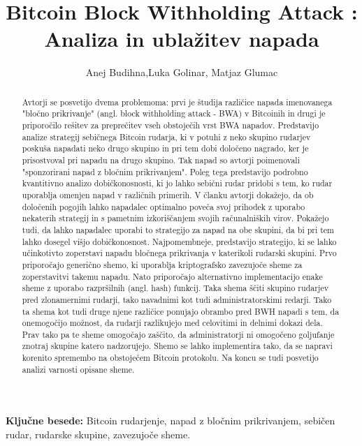 \documentclass[12pt]{article}
\begin{document}
\setcounter{page}{1}

\title{Bitcoin Block Withholding Attack : Analiza in ublažitev napada}
\author{Anej Budihna,Luka Golinar, Matjaz Glumac}


\maketitle
\begin{abstract}

Avtorji se posvetijo dvema problemoma: prvi je študija različice napada imenovanega "bločno prikrivanje" (angl. block withholding attack - BWA) v Bitcoinih in drugi je priporočilo rešitev za preprečitev vseh obstoječih vrst  BWA napadov. Predstavijo analize strategij sebičnega Bitcoin rudarja, ki v potuhi z neko skupino rudarjev poskuša napadati neko drugo skupino in pri tem dobi določeno nagrado, ker je prisostvoval pri napadu na drugo skupino. Tak napad so avtorji poimenovali "sponzorirani napad z bločnim prikrivanjem". Poleg tega predstavijo podrobno kvantitivno analizo dobičkonosnosti, ki jo lahko sebični rudar pridobi s tem, ko rudar uporablja omenjen napad v različnih primerih. V članku avtorji dokažejo, da ob določenih pogojih lahko napadalec optimalno poveča svoj prihodek z uporabo nekaterih strategij in s pametnim izkoriščanjem svojih računalniških virov. Pokažejo tudi, da lahko napadalec uporabi to strategijo za napad na obe skupini, da bi pri tem lahko dosegel višjo dobičkonosnost.
\indent Najpomembneje, predstavijo strategijo, ki se lahko učinkotivto zoperstavi napadu bločnega prikrivanja v katerikoli rudarski skupini. Prvo priporočajo generično shemo, ki uporablja kriptografsko zavezujoče sheme za zoperstavitvi takemu napadu. Nato priporočajo alternativno implementacijo enake sheme z uporabo razpršilnih (angl. hash) funkcij. Taka shema ščiti skupino rudarjev pred zlonamernimi rudarji, tako navadnimi kot tudi administratorskimi redarji. Tako ta shema kot tudi druge njene različice ponujajo obrambo pred BWH napadi s tem, da onemogočijo možnost, da rudarji razlikujejo med celovitimi in delnimi dokazi dela. Prav tako pa te sheme omogočajo zaščito, da administratorji ni omogočeno goljufanje znotraj skupine katero nadzorujejo. Shemo se lahko implementira tako, da se napravi korenito spremembo na obstoječem Bitcoin protokolu.
Na koncu se tudi posvetijo analizi varnosti opisane sheme.

\end{abstract}
{\large \bf Ključne besede:} Bitcoin rudarjenje, napad z bločnim prikrivanjem, sebičen rudar, rudarske skupine, zavezujoče sheme.
\end{document}
